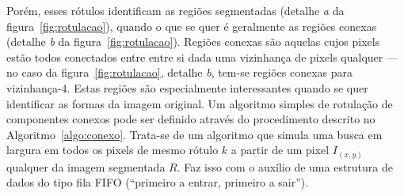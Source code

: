 \begin{figure}[ht!]
\begin{center}
\fonteminha

\end{center}
\end{figure}


Porém, esses rótulos identificam as regiões segmentadas (detalhe
\textit{a} da figura~\ref{fig:rotulacao}), quando o que se quer é
geralmente as regiões conexas (detalhe \textit{b} da
figura~\ref{fig:rotulacao}). Regiões conexas são aquelas cujos pixels
estão todos conectados entre entre si dada uma vizinhança de pixels
qualquer --- no caso da figura~\ref{fig:rotulacao}, detalhe
\textit{b}, tem-se regiões conexas para vizinhança-4. Estas regiões
são especialmente interessantes quando se quer identificar as formas
da imagem original. Um algoritmo simples de rotulação de componentes
conexos pode ser definido através do procedimento descrito no
Algoritmo~\ref{algo:conexo}. Trata-se de um algoritmo que simula uma
busca em largura em todos os pixels de mesmo rótulo $k$ a partir de um
pixel $I_{(x,y)}$ qualquer da imagem segmentada $R$. Faz isso com o
auxílio de uma estrutura de dados do tipo fila FIFO (``primeiro a
entrar, primeiro a sair'').

